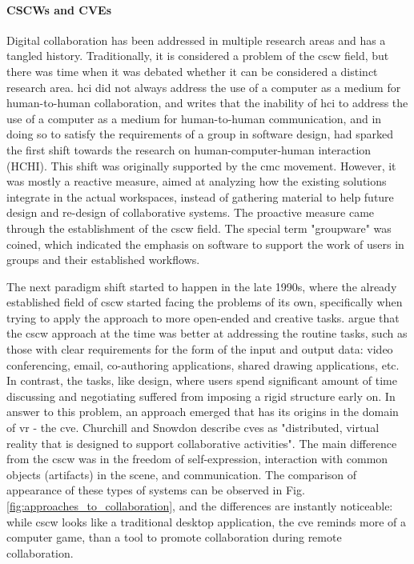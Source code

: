 


\paragraph[]{CSCWs and CVEs}
Digital collaboration has been addressed in multiple research areas and has a tangled history. Traditionally, it is considered a problem of the \gls{cscw} field, but there was time when it was debated whether it can be considered a distinct research area. 
\gls{hci} did not always address the use of a computer as a medium for human-to-human collaboration, and \parencite{bannon_perspectives_nodate} writes that the inability of \gls{hci} to address the use of a computer as a medium for human-to-human communication, and in doing so to satisfy the requirements of a group in software design, had sparked the first shift towards the research on human-computer-human interaction (HCHI). 
This shift was originally supported by the \gls{cmc} movement. However, it was mostly a reactive measure, aimed at analyzing how the existing solutions integrate in the actual workspaces, instead of gathering material to help future design and re-design of collaborative systems. The proactive measure came through the establishment of the \gls{cscw} field. The special term "groupware" was coined, which indicated the emphasis on software to support the work of users in groups and their established workflows.

The next paradigm shift started to happen in the late 1990s, where the already established field of \gls{cscw} started facing the problems of its own, specifically when trying to apply the approach to more open-ended and creative tasks. \parencite{churchill_collaborative_1998} argue that the \gls{cscw} approach at the time was better at addressing the routine tasks, such as those with clear requirements for the form of the input and output data: video conferencing, email, co-authoring applications, shared drawing applications, etc. In contrast, the tasks, like design, where users spend significant amount of time discussing and negotiating suffered from imposing a rigid structure early on. In answer to this problem, an approach emerged that has its origins in the domain of \gls{vr} - the \gls{cve}. Churchill and Snowdon describe \gls{cve}s as "distributed, virtual reality that is designed to support collaborative activities". The main difference from the \gls{cscw} was in the freedom of self-expression, interaction with common objects (artifacts) in the scene, and communication. The comparison of appearance of these types of systems can be observed in Fig. \ref{fig:approaches_to_collaboration}, and the differences are instantly noticeable: while \gls{cscw} looks like a traditional desktop application, the \gls{cve} reminds more of a computer game, than a tool to promote collaboration during remote collaboration. 

